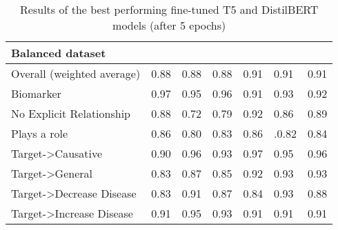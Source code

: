 \documentclass[final,12pt,3p,times,twocolumn,authoryear]{elsarticle}
\begin{document}
\begin{table*}[!t]
\begin{tabular}{|l|l|l|l|l|l|l|}
         \multicolumn{7}{|l|}{Balanced dataset}  \\  \hline  
       Overall (weighted average)  &  0.88 & 0.88 & 0.88 & 0.91 & 0.91 & 0.91\\
        \hspace*{3mm} Biomarker & 0.97   &   0.95   &   0.96 & 0.91 & 0.93 & 0.92 \\
        \hspace*{3mm} No Explicit Relationship   & 0.88  &   0.72 &    0.79 & 0.92 & 0.86 & 0.89 \\
        \hspace*{3mm} Plays a role &  0.86   & 0.80 &   0.83 & 0.86 & .0.82 & 0.84\\ 
        \hspace*{3mm} Target-\textgreater Causative  & 0.90 &    0.96 &     0.93 & 0.97 & 0.95 & 0.96\\
        \hspace*{3mm} Target-\textgreater General        & 0.83   & 0.87 &    0.85 & 0.92 & 0.93 & 0.93\\
        \hspace*{3mm} Target-\textgreater  Decrease Disease & 0.83 &    0.91  & 0.87  & 0.84 & 0.93 & 0.88 \\
        \hspace*{3mm} Target-\textgreater  Increase Disease   &  0.91  &   0.95   &  0.93 & 0.91 & 0.91 & 0.91 \\ 
        \hline
        
    \end{tabular}
    \caption{Results of the best performing fine-tuned T5 and DistilBERT models (after 5 epochs)}
    \label{tab:t5_res}
\end{table*}  
\end{document}
